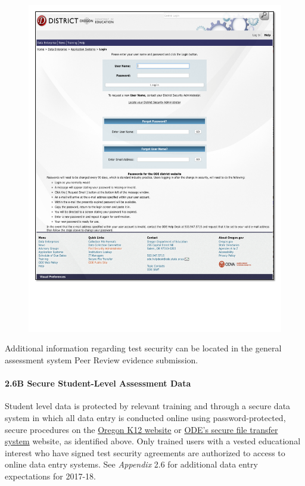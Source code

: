 \documentclass[]{article}
\let\oldparagraph\paragraph
\renewcommand{\paragraph}[1]{\oldparagraph{#1}\mbox{}}
\begin{document}
\begin{figure}
\centering
\includegraphics{Figures/TrainingSite/SecureSite.pdf}
\caption{}
\end{figure}

Additional information regarding test security can be located in the
general assessment system Peer Review evidence submission.

\paragraph{2.6B Secure Student-Level Assessment
Data}\label{b-secure-student-level-assessment-data}

Student level data is protected by relevant training and through a
secure data system in which all data entry is conducted online using
password-protected, secure procedures on the \color{link}
\href{https://or.k12test.com}{Oregon K12 website} \color{black} or
\color{link} \href{https://district.ode.state.or.us/apps/login/}{ODE's
secure file transfer system} \color{black} website, as identified above.
Only trained users with a vested educational interest who have signed
test security agreements are authorized to access to online data entry
systems. See \emph{Appendix} 2.6 for additional data entry expectations
for 2017-18.
\end{document}
